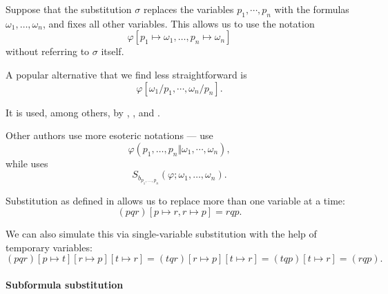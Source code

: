 \begin{remark}\label{rem:substitution_notation}
  Suppose that the substitution \( \sigma \) replaces the variables \( p_1, \cdots, p_n \) with the formulas \( \omega_1, \ldots, \omega_n \), and fixes all other variables. This allows us to use the notation
  \begin{equation*}
    \varphi[p_1 \mapsto \omega_1, \ldots, p_n \mapsto \omega_n]
  \end{equation*}
  without referring to \( \sigma \) itself.

  A popular alternative that we find less straightforward is
  \begin{equation*}
    \varphi[\omega_1 / p_1, \cdots, \omega_n / p_n].
  \end{equation*}

  It is used, among others, by , ,  and .

  Other authors use more esoteric notations ---  use
  \begin{equation*}
    \varphi(p_1, \ldots, p_n \Vert \omega_1, \cdots, \omega_n),
  \end{equation*}
  while  uses
  \begin{equation*}
    S_{b_{p_1, \ldots, p_n}}(\varphi; \omega_1, \ldots, \omega_n).
  \end{equation*}
\end{remark}

\begin{remark}\label{rem:simulating_simultaneous_substitution}
  Substitution as defined in  allows us to replace more than one variable at a time:
  \begin{equation*}
    (pqr)[p \mapsto r, r \mapsto p]
    =
    rqp.
  \end{equation*}

  We can also simulate this via single-variable substitution with the help of temporary variables:
  \begin{equation*}
    (pqr)[p \mapsto t][r \mapsto p][t \mapsto r]
    =
    (tqr)[r \mapsto p][t \mapsto r]
    =
    (tqp)[t \mapsto r]
    =
    (rqp).
  \end{equation*}
\end{remark}

\paragraph{Subformula substitution}\hfill

